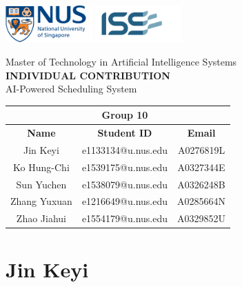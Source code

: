 \documentclass[12pt, a4paper]{article}
\begin{document}
\begin{flushright}
    \includegraphics[height=40pt]{Images/Logos/nus.png} 
    \vrule
    \includegraphics[height=40pt]{Images/Logos/iss.png}
\end{flushright}

\vspace{1.0in}

\begin{center}   
    \large Master of Technology in Artificial Intelligence Systems \\
    \Huge \MakeUppercase{\textbf{Individual Contribution}} \\
    \Large AI-Powered Scheduling System \\

    \vspace{4.0in}
    
    \normalsize
    \begin{tabular}{c c c}
        \toprule
        & \textbf{Group 10} & \\ \midrule
        \textbf{Name} & \textbf{Student ID} & \textbf{Email} \\ \midrule
        Jin Keyi & e1133134@u.nus.edu & A0276819L \\ 
        Ko Hung-Chi & e1539175@u.nus.edu & A0327344E \\ 
        Sun Yuchen & e1538079@u.nus.edu & A0326248B \\ 
        Zhang Yuxuan & e1216649@u.nus.edu & A0285664N \\
        Zhao Jiahui & e1554179@u.nus.edu & A0329852U \\ \bottomrule
    \end{tabular}
\end{center}

\newpage

\tableofcontents

\newpage

\section{Jin Keyi} 
\end{document}
